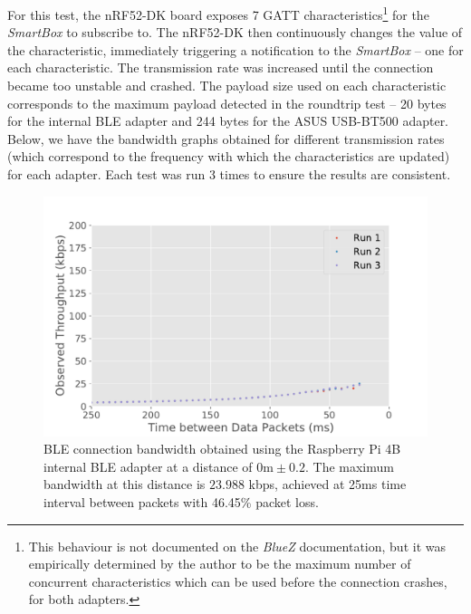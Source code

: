 For this test, the nRF52-DK board exposes 7 \acs{GATT} characteristics\footnote{This behaviour is not documented on the \textit{BlueZ} documentation, but it was empirically determined by the author to be the maximum number of concurrent characteristics which can be used before the connection crashes, for both adapters.} for the \textit{SmartBox} to subscribe to. The nRF52-DK then continuously changes the value of the characteristic, immediately triggering a notification to the \textit{SmartBox} -- one for each characteristic. The transmission rate was increased until the connection became too unstable and crashed. The payload size used on each characteristic corresponds to the maximum payload detected in the roundtrip test -- 20 bytes for the internal \acs{BLE} adapter and 244 bytes for the ASUS USB-BT500 adapter.
Below, we have the bandwidth graphs obtained for different transmission rates (which correspond to the frequency with which the characteristics are updated) for each adapter. Each test was run 3 times to ensure the results are consistent.


\begin{figure}[H]
    \centering
    \includegraphics[width=0.75\linewidth]{images/ble-bandwidth-hci1-0cm.pdf}
    \caption[\acs{BLE} connection bandwidth obtained using the ASUS USB-BT500 adapter at a distance of 0m.]
    {\acs{BLE} connection bandwidth obtained using the Raspberry Pi 4B internal \acs{BLE} adapter at a distance of $0\text{m} \pm 0.2$. The maximum bandwidth at this distance is $23.988$ kbps, achieved at 25ms time interval between packets with 46.45\% packet loss.}
    \label{fig:ble-bandwidth-hci1-0m}
\end{figure}

